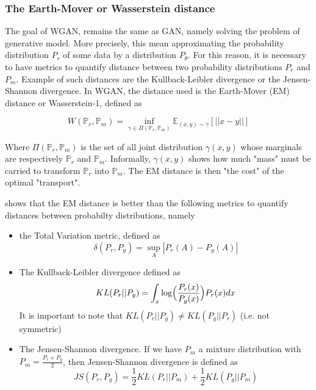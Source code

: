 \documentclass{article}
\begin{document}
\subsubsection{The Earth-Mover or Wasserstein distance}


The goal of WGAN, remains the same as GAN, namely solving the problem of generative model. More precisely, this mean approximating the probability distribution $P_r$ of some data by a distribution $P_{\theta}$. For this reason, it is necessary to have metrics to quantify distance between two probability distributions $P_r$ and $P_m$. Example of such distances are the Kullback-Leibler divergence or the Jensen-Shannon divergence. In WGAN, the distance used is the Earth-Mover (EM) distance or Wasserstein-1, defined as 

\begin{equation}
    W(\mathbb{P}_r, \mathbb{P}_m) = \inf_{\gamma \in \Pi(\mathbb{P}_r, \mathbb{P}_m)} \mathbb{E}_{(x,y) \sim \gamma} [||x-y||]
\end{equation}

Where $\Pi(\mathbb{P}_r, \mathbb{P}_m)$ is the set of all joint distribution $\gamma(x,y)$ whose marginals are respectively $\mathbb{P}_r$ and $\mathbb{P}_m$. Informally, $\gamma(x,y)$ shows how much "mass" must be carried to transform $\mathbb{P}_r$ into $\mathbb{P}_m$. The EM distance is then "the cost" of the optimal "transport".

\cite{arjovsky2017wasserstein} shows that the EM distance is better than the following metrics to quantify distances between probabilty distributions, namely

\begin{itemize}
    \item the Total Variation metric, defined as
    \begin{equation}
        \delta(P_r, P_g) = \sup_{A} |P_r(A) -  P_g(A)|
    \end{equation}
    \item The Kullback-Leibler divergence defined as
    \begin{equation}
        KL(P_r||P_g) = \int_x  \log \Bigl( \frac{P_r(x)}{P_g(x)} \Bigr) P_r(x) dx
    \end{equation}
    It is important to note that $KL(P_r||P_g) \neq KL(P_g||P_r)$ (i.e. not symmetric)
    \item The Jensen-Shannon divergence. If we have $P_m$ a mixture distribution with $P_m = \frac{P_r + P_g}{2}$, then Jensen-Shannon divergence is defined as  
    \begin{equation}
        JS(P_r, P_g) = \frac{1}{2} KL(P_r||P_m) + \frac{1}{2} KL(P_g||P_m)
    \end{equation}
\end{itemize}
\end{document}
